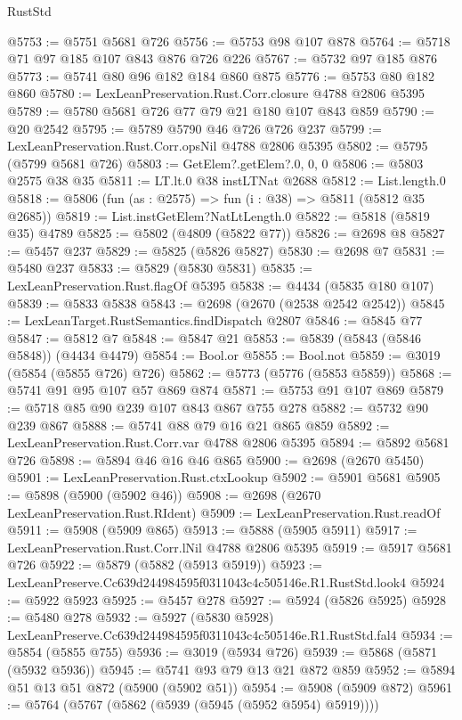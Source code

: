 \begin{lexlean}{RustStd}
\begin{coremodule}
@5753 := @5751 @5681 @726
@5756 := @5753 @98 @107 @878
@5764 := @5718 @71 @97 @185 @107 @843 @876 @726 @226
@5767 := @5732 @97 @185 @876
@5773 := @5741 @80 @96 @182 @184 @860 @875
@5776 := @5753 @80 @182 @860
@5780 := LexLeanPreservation.Rust.Corr.closure @4788 @2806 @5395
@5789 := @5780 @5681 @726 @77 @79 @21 @180 @107 @843 @859
@5790 := @20 @2542
@5795 := @5789 @5790 @46 @726 @726 @237
@5799 := LexLeanPreservation.Rust.Corr.opsNil @4788 @2806 @5395
@5802 := @5795 (@5799 @5681 @726)
@5803 := GetElem?.getElem?.{0, 0, 0}
@5806 := @5803 @2575 @38 @35
@5811 := LT.lt.{0} @38 instLTNat @2688
@5812 := List.length.{0}
@5818 := @5806 (fun (as : @2575) => fun (i : @38) => @5811 (@5812 @35 @2685))
@5819 := List.instGetElem?NatLtLength.{0}
@5822 := @5818 (@5819 @35) @4789
@5825 := @5802 (@4809 (@5822 @77))
@5826 := @2698 @8
@5827 := @5457 @237
@5829 := @5825 (@5826 @5827)
@5830 := @2698 @7
@5831 := @5480 @237
@5833 := @5829 (@5830 @5831)
@5835 := LexLeanPreservation.Rust.flagOf @5395
@5838 := @4434 (@5835 @180 @107)
@5839 := @5833 @5838
@5843 := @2698 (@2670 (@2538 @2542 @2542))
@5845 := LexLeanTarget.RustSemantics.findDispatch @2807
@5846 := @5845 @77
@5847 := @5812 @7
@5848 := @5847 @21
@5853 := @5839 (@5843 (@5846 @5848)) (@4434 @4479)
@5854 := Bool.or
@5855 := Bool.not
@5859 := @3019 (@5854 (@5855 @726) @726)
@5862 := @5773 (@5776 (@5853 @5859))
@5868 := @5741 @91 @95 @107 @57 @869 @874
@5871 := @5753 @91 @107 @869
@5879 := @5718 @85 @90 @239 @107 @843 @867 @755 @278
@5882 := @5732 @90 @239 @867
@5888 := @5741 @88 @79 @16 @21 @865 @859
@5892 := LexLeanPreservation.Rust.Corr.var @4788 @2806 @5395
@5894 := @5892 @5681 @726
@5898 := @5894 @46 @16 @46 @865
@5900 := @2698 (@2670 @5450)
@5901 := LexLeanPreservation.Rust.ctxLookup
@5902 := @5901 @5681
@5905 := @5898 (@5900 (@5902 @46))
@5908 := @2698 (@2670 LexLeanPreservation.Rust.RIdent)
@5909 := LexLeanPreservation.Rust.readOf
@5911 := @5908 (@5909 @865)
@5913 := @5888 (@5905 @5911)
@5917 := LexLeanPreservation.Rust.Corr.lNil @4788 @2806 @5395
@5919 := @5917 @5681 @726
@5922 := @5879 (@5882 (@5913 @5919))
@5923 := LexLeanPreserve.Cc639d244984595f0311043c4c505146e.R1.RustStd.look4
@5924 := @5922 @5923
@5925 := @5457 @278
@5927 := @5924 (@5826 @5925)
@5928 := @5480 @278
@5932 := @5927 (@5830 @5928) LexLeanPreserve.Cc639d244984595f0311043c4c505146e.R1.RustStd.fal4
@5934 := @5854 (@5855 @755)
@5936 := @3019 (@5934 @726)
@5939 := @5868 (@5871 (@5932 @5936))
@5945 := @5741 @93 @79 @13 @21 @872 @859
@5952 := @5894 @51 @13 @51 @872 (@5900 (@5902 @51))
@5954 := @5908 (@5909 @872)
@5961 := @5764 (@5767 (@5862 (@5939 (@5945 (@5952 @5954) @5919))))

\end{coremodule}
\end{lexlean}
